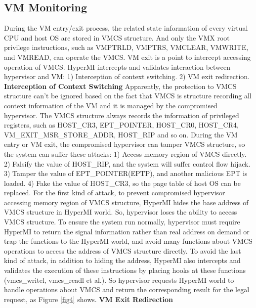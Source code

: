 \documentclass[conference]{IEEEtran}
\begin{document}
\subsection{VM Monitoring}
During the VM entry/exit process, the related state information of every virtual CPU and host OS are stored in VMCS structure. 
And only the VMX root privilege instructions, such as VMPTRLD, VMPTRS, VMCLEAR, VMWRITE, and VMREAD, can operate the VMCS.
VM exit is a point to intercept accessing operation of VMCS. HyperMI intercepts and validates interaction between hypervisor and VM: 1) Interception of context switching. 2) VM exit redirection.
\textbf{Interception of Context Switching}
Apparently, the protection to VMCS structure can't be ignored based on the fact that VMCS is structure recording all context information of the VM and it is managed by the compromised hypervisor. 
The VMCS structure always records the information of privileged registers, such as HOST\_CR3, EPT\_POINTER, HOST\_CR0, HOST\_CR4, VM\_EXIT\_MSR\_STORE\_ADDR, HOST\_RIP and so on. During the VM entry or VM exit, the compromised hypervisor can tamper VMCS structure, so the system can suffer these attacks: 1) Access memory region of VMCS directly. 2) Falsify the value of HOST\_RIP, and the system will suffer control flow hijack. 3) Tamper the value of EPT\_POINTER(EPTP), and another malicious EPT is loaded. 4) Fake the value of HOST\_CR3, so the page table of host OS can be replaced.
For the first kind of attack, to prevent compromised hypervisor accessing memory region of VMCS structure, HyperMI hides the base address of VMCS structure in HyperMI world. So, hypervisor loses the ability to access VMCS structure. To ensure the system run normally, hypervisor must require HyperMI to return the signal information rather than real address on demand or trap the functions to the HyperMI world, and avoid many functions about VMCS operations to access the address of VMCS structure directly. To avoid the last kind of attack, in addition to hiding the address, HyperMI also intercepts and validates the execution of these instructions by placing hooks at these functions (vmcs\_writel, vmcs\_readl et al.). So hypervisor requests HyperMI world to handle operations about VMCS and return the corresponding result for the legal request, as Figure \ref{fig4} shows.
\textbf{VM Exit Redirection}
\end{document}
